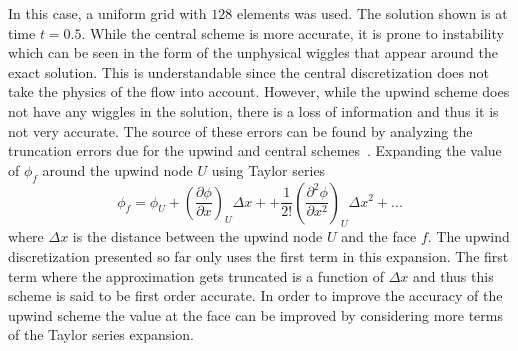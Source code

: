 In this case, a uniform grid with $128$ elements was used. The solution shown is at time $t=0.5$. While the central scheme is more accurate, it is prone to instability which can be seen in the form of the unphysical wiggles that appear around the exact solution. This is understandable since the central discretization does not take the physics of the flow into account. However, while the upwind scheme does not have any wiggles in the solution, there is a loss of information and thus it is not very accurate. The source of these errors can be found by analyzing the truncation errors due for the upwind and central schemes~\cite{Moukalled, Ferziger2002}. Expanding the value of $\phi_f$ around the upwind node $U$ using Taylor series
\begin{equation}
\phi_f = \phi_U + \left(\frac{\partial \phi}{\partial x}\right)_U\Delta x + + \frac{1}{2!}\left(\frac{\partial^2 \phi}{\partial x^2}\right)_U\Delta x^2 + ...
\end{equation}
where $\Delta x$ is the distance between the upwind node $U$ and the face $f$. The upwind discretization presented so far only uses the first term in this expansion. The first term where the approximation gets truncated is a function of $\Delta x$ and thus this scheme is said to be first order accurate. In order to improve the accuracy of the upwind scheme the value at the face can be improved by considering more terms of the Taylor series expansion.
